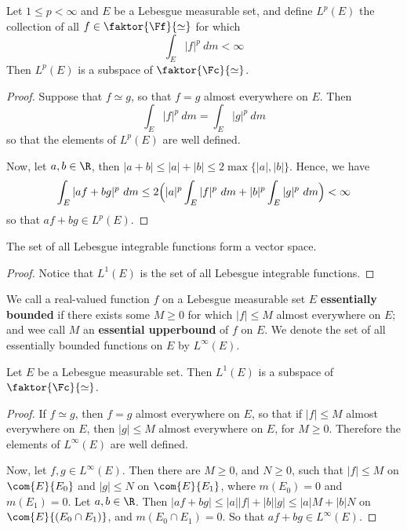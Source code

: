 \begin{theorem}\label{theorem_12.1.3}
  Let $1 \leq p <\infty$ and $E$ be a Lebesgue measurable set, and define
  $L^p(E)$ the collection of all $f \in \faktor{\Ff}{\simeq}$ for which
  \begin{equation*}
    \int_E{|f|^p \ dm}<\infty
  \end{equation*}
  Then $L^p(E)$ is a subspace of $\faktor{\Fc}{\simeq}$.
\end{theorem}
\begin{proof}
  Suppose that $f \simeq g$, so that  $f=g$ almost everywhere on  $E$. Then
  \begin{equation}
  \int_E{|f|^p \ dm}=\int_E{|g|^p \ dm}
  \end{equation}
  so that the elements of $L^p(E)$ are well defined.

  Now, let $a,b \in \R$, then $|a+b| \leq |a|+|b| \leq 2\max{\{|a|,|b|\}}$.
  Hence, we have
  \begin{equation*}
    \int_E{|af+bg|^p \ dm} \leq
    2\Big{(} |a|^p\int_E{|f|^p \ dm}+|b|^p\int_E{|g|^p \ dm} \Big{)}<\infty
  \end{equation*}
  so that $af+bg \in L^p(E)$.
\end{proof}
\begin{corollary}
  The set of all Lebesgue integrable functions form a vector space.
\end{corollary}
\begin{proof}
  Notice that $L^1(E)$ is the set of all Lebesgue integrable functions.
\end{proof}

\begin{definition}
  We call a real-valued function $f$ on a Lebesgue measurable set $E$
  \textbf{essentially bounded} if there exists some $M \geq 0$ for which $|f|
  \leq M$ almost everywhere on $E$; and wee call $M$ an \textbf{essential
  upperbound} of $f$ on  $E$. We denote the set of all essentially bounded
  functions on  $E$ by  $L^\infty(E)$.
\end{definition}

\begin{lemma}\label{lemma_12.1.4}
  Let $E$ be a Lebesgue measurable set. Then $L^1(E)$ is a subspace of
  $\faktor{\Fc}{\simeq}$.
\end{lemma}
\begin{proof}
  If $f \simeq g$, then  $f=g$ almost everywhere on  $E$, so that if $|f| \leq
  M$ almost everywhere on $E$, then $|g| \leq M$ almost everywhere on $E$, for
  $M \geq 0$. Therefore the elements of $L^\infty(E)$ are well defined.

  Now, let $f,g \in L^\infty(E)$. Then there are $M \geq 0$, and $N \geq 0$,
  such that $|f| \leq M$ on $\com{E}{E_0}$ and $|g| \leq N$ on $\com{E}{E_1}$,
  where $m(E_0)=0$ and $m(E_1)=0$. Let $a,b \in \R$. Then $|af+bg| \leq
  |a||f|+|b||g| \leq |a|M+|b|N$ on $\com{E}{(E_0 \cap E_1)}$, and $m(E_0 \cap
  E_1)=0$. So that $af+bg \in L^\infty(E)$.
\end{proof}

